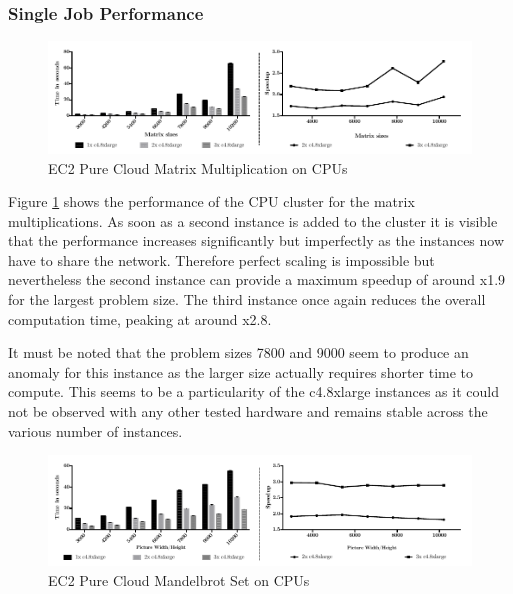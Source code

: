 \subsubsection*{Single Job Performance}
\begin{figure}[!htb]
	\includegraphics[width=1.0\textwidth]{images/ec2_cpu_matrix_multiplication.pdf}
	\centering
	\caption{EC2 Pure Cloud Matrix Multiplication on CPUs}
	\label{img:ec2_cpu_matrix_multiplication}
\end{figure}

Figure \ref{img:ec2_cpu_matrix_multiplication} shows the performance of the CPU cluster for the matrix multiplications. As soon as a second instance is added to the cluster it is visible that the performance increases significantly but imperfectly as the instances now have to share the network. Therefore perfect scaling is impossible but nevertheless the second instance can provide a maximum speedup of around x1.9 for the largest problem size. The third instance once again reduces the overall computation time, peaking at around x2.8.

\begin{minipage}{\linewidth}
It must be noted that the problem sizes 7800 and 9000 seem to produce an anomaly for this instance as the larger size actually requires shorter time to compute. This seems to be a particularity of the c4.8xlarge instances as it could not be observed with any other tested hardware and remains stable across the various number of instances.
\end{minipage}

\begin{figure}[!htb]
	\includegraphics[width=1.0\textwidth]{images/ec2_cpu_mandelbrot.pdf}
	\centering
	\caption{EC2 Pure Cloud Mandelbrot Set on CPUs}
	\label{img:ec2_cpu_mandelbrot}
\end{figure}


